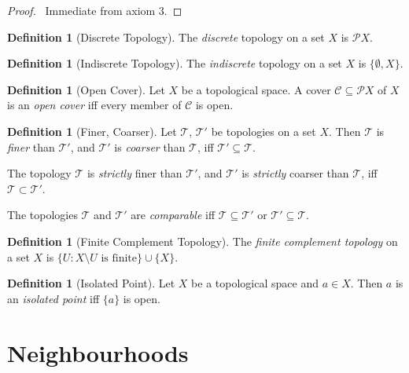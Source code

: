 \documentclass{report}
\let\qed\relax
\theoremstyle{definition}
\newtheorem{df}[lm]{Definition}
\begin{document}
  \begin{proof}
    \pf\ Immediate from axiom 3. \qed
  \end{proof}

  \begin{df}[Discrete Topology]
    The \emph{discrete} topology on a set $X$ is $\mathcal{P} X$.
  \end{df}

  \begin{df}[Indiscrete Topology]
    The \emph{indiscrete} topology on a set $X$ is $\{ \emptyset, X \}$.
  \end{df}

  \begin{df}[Open Cover] %
    Let $X$ be a topological space. A cover $\mathcal{C} \subseteq \mathcal{P}
    X$ of $X$ is an \emph{open cover} iff every member of $\mathcal{C}$ is open.
  \end{df}

  \begin{df}[Finer, Coarser]
    Let $\mathcal{T}$, $\mathcal{T}'$ be topologies on a set $X$. Then
    $\mathcal{T}$ is \emph{finer} than $\mathcal{T}'$, and $\mathcal{T}'$ is
    \emph{coarser} than $\mathcal{T}$, iff $\mathcal{T}' \subseteq \mathcal{T}$.

    The topology $\mathcal{T}$ is \emph{strictly} finer than $\mathcal{T}'$,
    and
    $\mathcal{T}'$ is \emph{strictly} coarser than $\mathcal{T}$, iff
    $\mathcal{T} \subset \mathcal{T}'$.

    The topologies $\mathcal{T}$ and $\mathcal{T}'$ are \emph{comparable} iff
    $\mathcal{T} \subseteq \mathcal{T}'$ or $\mathcal{T}' \subseteq
    \mathcal{T}$.
  \end{df}

  \begin{df}[Finite Complement Topology]
    The \emph{finite complement topology} on a set $X$ is $\{ U : X \setminus U
    \text{ is finite} \} \cup \{ X \}$.
  \end{df}

  \begin{df}[Isolated Point]
    Let $X$ be a topological space and $a \in X$. Then $a$ is an \emph{isolated
      point} iff $\{a\}$ is open.
  \end{df}

  \section{Neighbourhoods}
\end{document}
